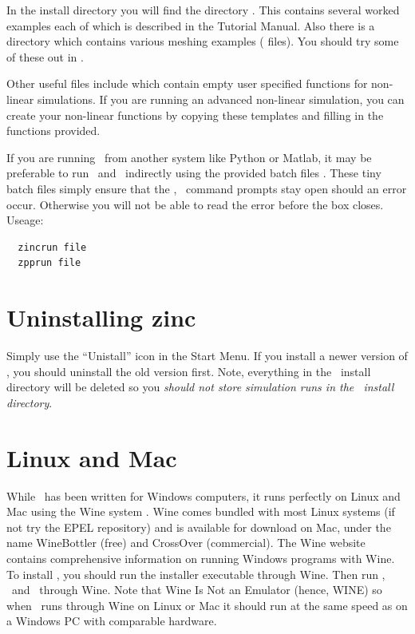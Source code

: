 \documentclass[a4paper,twoside,11pt]{book}
\begin{document}
In the install directory you will find the directory
. This contains several worked examples each of which is
described in the Tutorial Manual. Also there is a 
directory which contains various meshing examples (
files). You should try some of these out in \zmesh.

Other useful files include  which
contain empty user specified functions for non-linear simulations. If
you are running an advanced non-linear simulation, you can create your
non-linear functions by copying these templates and filling in the
functions provided.

If you are running \zinc\ from another system like Python or Matlab,
it may be preferable to run \zinc\ and \zpp\ indirectly using the
provided batch files . These tiny batch files
simply ensure that the \zinc, \zpp\ command prompts stay open
should an error occur. Otherwise you will not be able to read the
error before the box closes. Useage:
\begin{verbatim}
  zincrun file
  zpprun file
\end{verbatim}

\section{Uninstalling zinc}
Simply use the ``Unistall'' icon in the Start Menu. If you install a
newer version of \zinc, you should uninstall the old version
first. Note, everything in the \zinc\ install directory will be
deleted so you \emph{should not store simulation runs in the
  \zinc\ install directory}.

\section{Linux and Mac}

While \zinc\ has been written for Windows computers, it runs perfectly
on Linux and Mac using the Wine system \cite{wine}. Wine comes bundled
with most Linux systems (if not try the EPEL repository) and is
available for download on Mac, under the name
WineBottler\cite{winebottler} (free) and CrossOver\cite{crossover}
(commercial). The Wine website contains comprehensive information on
running Windows programs with Wine. To install \zinc, you should run
the installer executable through Wine. Then run \zmesh, \zinc\ and
\zpp\ through Wine. Note that Wine Is Not an Emulator (hence, WINE) so
when \zinc\ runs through Wine on Linux or Mac it should run at the
same speed as on a Windows PC with comparable hardware.
\end{document}
